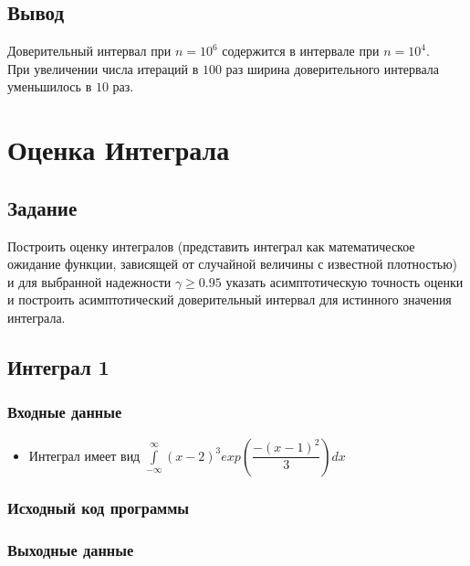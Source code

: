 \documentclass{article}
\begin{document}
    \subsection{Вывод}
        Доверительный интервал при $n = 10^6$ содержится в интервале при $n = 10^4$.\\
        При увеличении числа итераций в $100$ раз ширина доверительного интервала уменьшилось в $10$ раз.
\section{Оценка Интеграла}
    \subsection{Задание}
    Построить оценку интегралов (представить интеграл как математическое ожидание функции,
    зависящей от случайной величины с известной плотностью) и для выбранной надежности $\gamma \geq 0.95$ указать
    асимптотическую точность оценки и построить асимптотический доверительный интервал для истинного
    значения интеграла. 
    \subsection{Интеграл 1}
        \subsubsection{Входные данные}
            \begin{itemize}
                \item Интеграл имеет вид ${\displaystyle \int\limits_{-\infty}^{\infty} \left(x - 2\right)^3 exp \left( \dfrac{-(x - 1)^2}{3} \right) dx}$
            \end{itemize}
        \subsubsection{Исходный код программы}
        \begin{minipage}{\linewidth}
            
        \end{minipage}
        \subsubsection{Выходные данные}
        \begin{minipage}{\linewidth}
            
        \end{minipage}
\end{document}
